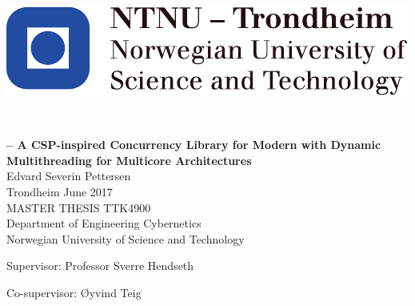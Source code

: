 
\thispagestyle{empty}

\begin{center}
\includegraphics{fig/NTNU}
\end{center}

\mbox{}\\[5.5pc]
\begin{center}
\Large\textbf{\Proxc{} -- A CSP\hyp{}inspired Concurrency Library for Modern \Cpp{} with Dynamic Multithreading for Multicore Architectures}\\[2pc]

\Large{Edvard Severin Pettersen}\\[1pc]
\large{Trondheim June 2017}\\[2pc]

MASTER THESIS TTK4900\\
Department of Engineering Cybernetics\\
Norwegian University of Science and Technology
\end{center}
\vfill

\noindent Supervisor: Professor Sverre Hendseth

\noindent Co-supervisor: Øyvind Teig

\afterpage{\blankpage}

